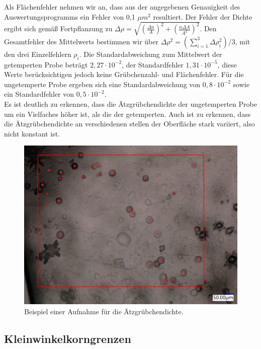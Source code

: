 	Als Flächenfehler nehmen wir an, dass aus der angegebenen Genauigkeit des Auswertungsprogramms ein Fehler von 0,1 $\mu m^2$ resultiert.
	Der Fehler der Dichte ergibt sich gemäß Fortpflanzung zu $\Delta \rho = \sqrt{(\frac{\Delta n}{A})^2 + (\frac{n\Delta A}{A^2})^2}$.
	Den Gesamtfehler des Mittelwerts bestimmen wir über $\Delta \rho^2 = (\sum_{i=1}^3 \Delta \rho_i^2)/3$, mit den drei Einzelfehlern $\rho_i$. Die Standardabweichung zum Mittelwert der getemperten Probe beträgt $2,27\cdot 10^{-2}$, der Standardfehler $1,31\cdot 10^{-5}$, diese Werte berücksichtigen jedoch keine Grübchenzahl- und Flächenfehler. Für die ungetemperte Probe ergeben sich eine Standardabweichung von $0,8\cdot 10^{-2}$ sowie ein Standardfehler von $0,5\cdot 10^{-2}$.\\
        Es ist deutlich zu erkennen, dass die Ätzgrübchendichte der ungetemperten Probe um ein Vielfaches höher ist, als die der getemperten.
        Auch ist zu erkennen, dass die Ätzgrübchendichte an verschiedenen stellen der Oberfläche stark variiert, also nicht konstant ist.
    \begin{figure}[H]
        \centering
        \includegraphics[width=\textwidth]{Images/Beispiel_ätzgrübchendichte.PNG}
        \caption{Beispiel einer Aufnahme für die Ätzgrübchendichte.}
    \end{figure}

    \subsection{Kleinwinkelkorngrenzen}
